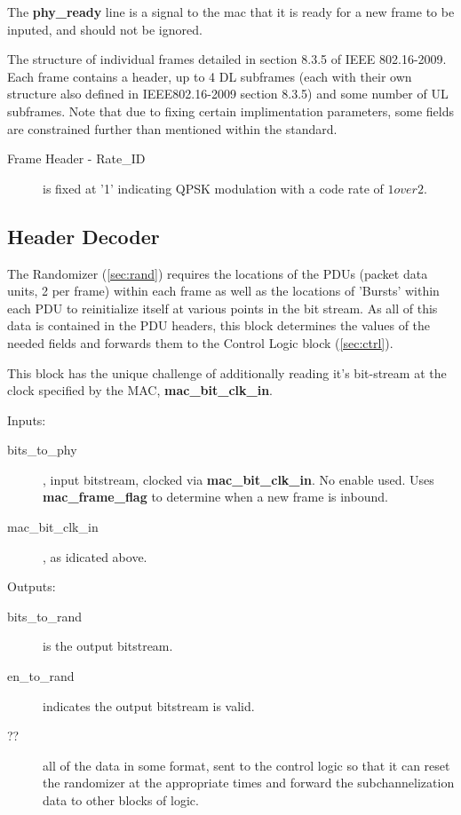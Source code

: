 \documentclass[10pt,twocolumn]{article}
\begin{document}
	The \textbf{phy\_ready} line is a signal to the mac that it is ready
	for a new frame to be inputed, and should not be ignored.

	The structure of individual frames detailed in section 8.3.5 of IEEE 802.16-2009.
	Each frame contains a header, up to 4 DL subframes (each with their own structure
	also defined in IEEE802.16-2009 section 8.3.5) and some number of UL subframes.
	Note that due to fixing certain implimentation parameters, some fields are constrained
	further than mentioned within the standard. 
	\begin{description}
		\item[Frame Header - Rate\_ID] is fixed at '1' indicating QPSK modulation with
			a code rate of $1 over 2$.
		\item[]
	\end{description}

	\subsection{Header Decoder}
	\label{sec:header}
	The Randomizer (\autoref{sec:rand}) requires the locations of the
	PDUs (packet data units, 2 per frame) within each frame as well as
	the locations of 'Bursts' within each PDU to reinitialize itself at
	various points in the bit stream. As all of this data is contained
	in the PDU headers, this block determines the values of the needed
	fields and forwards them to the Control Logic block
	(\autoref{sec:ctrl}). 

	This block has the unique challenge of additionally reading it's
	bit-stream at the clock specified by the MAC,
	\textbf{mac\_bit\_clk\_in}.

	\begin{description}
		\item{Inputs:} \begin{description}
			\item[bits\_to\_phy], input bitstream,  clocked via
				\textbf{mac\_bit\_clk\_in}.  No enable
				used. Uses \textbf{mac\_frame\_flag} to
				determine when a new frame is inbound.
			\item[mac\_bit\_clk\_in], as idicated above.
		\end{description}
		\item{Outputs:} \begin{description}
			\item[bits\_to\_rand] is the output bitstream.
			\item[en\_to\_rand] indicates the output bitstream
				is valid.
			\item[??] all of the data in some format, sent to
				the control logic so that it can reset the
				randomizer at the appropriate times and
				forward the subchannelization data to other
				blocks of logic.
		\end{description}
	\end{description}
\end{document}
